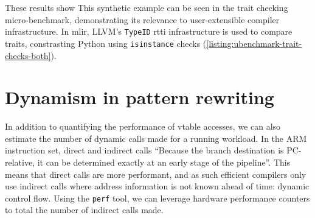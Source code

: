 These results show %
This synthetic example can be seen in the trait checking micro-benchmark, demonstrating its relevance to user-extensible compiler infrastructure. In \ac{mlir}, LLVM's \texttt{TypeID} \ac{rtti} infrastructure is used to compare traits, constrasting Python using \texttt{isinstance} checks (\autoref{listing:ubenchmark-trait-checks-both}).












\section{Dynamism in pattern rewriting}
\label{chap:dynamism-pattern-rewriting-summary}



In addition to quantifying the performance of \ac{vtable} accesses, we can also estimate the number of dynamic calls made for a running workload.
In the ARM instruction set, direct and indirect calls \cite{armlimitedARMCortexRSeries}
``Because the branch destination is PC-relative, it can be determined exactly at an early stage of the pipeline''. This means that direct calls are more performant, and as such efficient compilers only use indirect calls where address information is not known ahead of time: dynamic control flow.
Using the \texttt{perf} tool, we can leverage hardware performance counters to total the number of indirect calls made.


